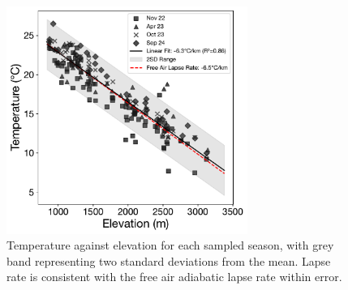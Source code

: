 \begin{figure}[h]
    \centering
    \includegraphics[width=0.7\textwidth]{Temperature_Elevation_Season.pdf}
    \caption{Temperature against elevation for each sampled season, with grey band representing two standard deviations from the mean. Lapse rate is consistent with the free air adiabatic lapse rate within error.}
    \label{fig:temperature}
\end{figure}

\FloatBarrier















